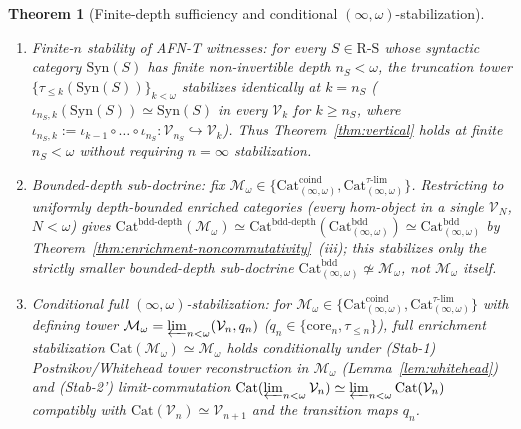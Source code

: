 \documentclass[11pt]{article}
\theoremstyle{plain}
\newtheorem{theorem}{Theorem}[section]
\theoremstyle{definition}
\newcommand{\RS}{\mathrm{R\text{-}S}}
\newcommand{\Cat}{\mathrm{Cat}}
\newcommand{\Syn}{\mathrm{Syn}}
\begin{document}
\begin{theorem}[Finite-depth sufficiency and conditional $(\infty, \omega)$-stabilization]\label{thm:cond-infty-stab}
\begin{enumerate}[nosep,label=(\roman*)]
\item \emph{Finite-$n$ stability of AFN-T witnesses}: for every $S \in \RS$ whose syntactic category $\Syn(S)$ has finite non-invertible depth $n_S < \omega$, the truncation tower $\{\tau_{\le k}(\Syn(S))\}_{k < \omega}$ stabilizes identically at $k = n_S$ ($\iota_{n_S, k}(\Syn(S)) \simeq \Syn(S)$ in every $\mathcal{V}_k$ for $k \ge n_S$, where $\iota_{n_S, k} := \iota_{k-1} \circ \dots \circ \iota_{n_S} : \mathcal{V}_{n_S} \hookrightarrow \mathcal{V}_k$). Thus Theorem~\ref{thm:vertical} holds at finite $n_S < \omega$ without requiring $n = \infty$ stabilization.
\item[\textup{(ii-a)}] \emph{Bounded-depth sub-doctrine}: fix $\mathcal{M}_\omega \in \{\Cat_{(\infty,\omega)}^{\mathrm{coind}}, \Cat_{(\infty,\omega)}^{\tau\text{-}\mathrm{lim}}\}$. Restricting to uniformly depth-bounded enriched categories (every hom-object in a single $\mathcal{V}_N$, $N < \omega$) gives $\Cat^{\mathrm{bdd\text{-}depth}}(\mathcal{M}_\omega) \simeq \Cat^{\mathrm{bdd\text{-}depth}}(\Cat_{(\infty,\omega)}^{\mathrm{bdd}}) \simeq \Cat_{(\infty,\omega)}^{\mathrm{bdd}}$ by Theorem~\ref{thm:enrichment-noncommutativity}~(iii); this stabilizes only the strictly smaller bounded-depth sub-doctrine $\Cat_{(\infty,\omega)}^{\mathrm{bdd}} \not\simeq \mathcal{M}_\omega$, not $\mathcal{M}_\omega$ itself.
\item[\textup{(ii-b)}] \emph{Conditional full $(\infty, \omega)$-stabilization}: for $\mathcal{M}_\omega \in \{\Cat_{(\infty,\omega)}^{\mathrm{coind}}, \Cat_{(\infty,\omega)}^{\tau\text{-}\mathrm{lim}}\}$ with defining tower $\mathcal{M}_\omega = \varprojlim_{n < \omega} (\mathcal{V}_n, q_n)$ ($q_n \in \{\mathrm{core}_n, \tau_{\le n}\}$), full enrichment stabilization $\Cat(\mathcal{M}_\omega) \simeq \mathcal{M}_\omega$ holds conditionally under \textup{(Stab-1)} Postnikov/Whitehead tower reconstruction in $\mathcal{M}_\omega$ (Lemma~\ref{lem:whitehead}) and \textup{(Stab-2')} limit-commutation $\Cat(\varprojlim_{n < \omega} \mathcal{V}_n) \simeq \varprojlim_{n < \omega} \Cat(\mathcal{V}_n)$ compatibly with $\Cat(\mathcal{V}_n) \simeq \mathcal{V}_{n+1}$ and the transition maps $q_n$.
\end{enumerate}
\end{theorem}
\end{document}
